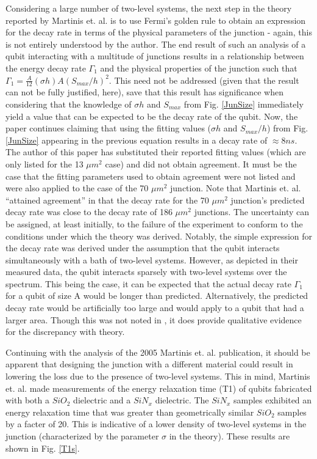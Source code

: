\documentclass[aps,prl,reprint,groupedaddress]{revtex4-1}
\begin{document}
Considering a large number of two-level systems, the next step in the theory reported by Martinis et. al. is to use Fermi's golden rule to obtain an expression for the decay rate in terms of the physical parameters of the junction - again, this is not entirely understood by the author. The end result of such an analysis of a qubit interacting with a multitude of junctions results in a relationship between the energy decay rate $\Gamma_1$ and the physical properties of the junction such that  $\Gamma_1 = \frac{A}{12}(\sigma h) A (S_{max}/h)^2 $. This need not be addressed (given that the result can not be fully justified, here), save that this result has significance when considering that the knowledge of $\sigma h$ and $S_{max}$ from Fig. \ref{JunSize} immediately yield a value that can be expected to be the decay rate of the qubit. Now, the paper continues claiming that using the fitting values ($\sigma h$ and $S_{max}/h$) from Fig. \ref{JunSize} appearing in the previous equation results in a decay rate of $\approx 8 ns$. The author of this paper has substituted their reported fitting values (which are only listed for the 13 $\mu m^2$ case) and did not obtain agreement. It must be the case that the fitting parameters used to obtain agreement were not listed and were also applied to the case of the 70 $\mu m^2$ junction. Note that Martinis et. al. ``attained agreement'' in that the decay rate for the 70 $\mu m^2$ junction's predicted decay rate was close to the decay rate of 186 $\mu m^2$ junctions. The uncertainty can be assigned, at least initially, to the failure of the experiment to conform to the conditions under which the theory was derived. Notably, the simple expression for the decay rate was derived under the assumption that the qubit interacts simultaneously with a bath of two-level systems. However, as depicted in their measured data, the qubit interacts sparsely with two-level systems over the spectrum. This being the case, it can be expected that the actual decay rate $\Gamma_1$ for a qubit of size A would be longer than predicted. Alternatively, the predicted decay rate would be artificially too large and would apply to a qubit that had a larger area. Though this was not noted in \cite{martinis_decoherence_2005}, it does provide qualitative evidence for the discrepancy with theory.

Continuing with the analysis of the 2005 Martinis et. al. publication, it should be apparent that designing the junction with a different material could result in lowering the loss due to the presence of two-level systems. This in mind, Martinis et. al. made measurements of the energy relaxation time (T1) of qubits fabricated with both a $SiO_2$ dielectric and a $SiN_x$ dielectric. The $SiN_x$ samples exhibited an energy relaxation time that was greater than geometrically similar $SiO_2$ samples by a facter of 20. This is indicative of a lower density of two-level systems in the junction (characterized by the parameter $\sigma$ in the theory). These results are shown in Fig. \ref{T1s}.
\end{document}
